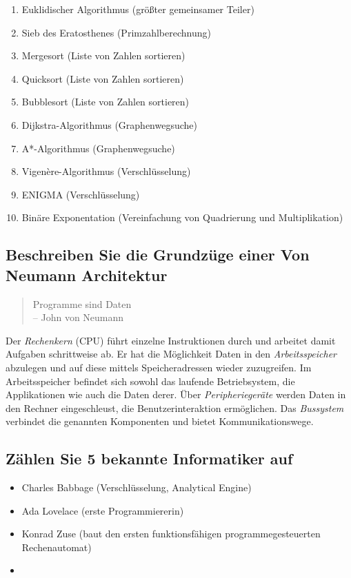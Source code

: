\begin{enumerate}
  \item Euklidischer Algorithmus (größter gemeinsamer Teiler)
  \item Sieb des Eratosthenes (Primzahlberechnung)
  \item Mergesort (Liste von Zahlen sortieren)
  \item Quicksort (Liste von Zahlen sortieren)
  \item Bubblesort (Liste von Zahlen sortieren)
  \item Dijkstra-Algorithmus (Graphenwegsuche)
  \item A*-Algorithmus (Graphenwegsuche)
  \item Vigenère-Algorithmus (Verschlüsselung)
  \item ENIGMA (Verschlüsselung)
  \item Binäre Exponentation (Vereinfachung von Quadrierung
    und Multiplikation)
\end{enumerate}

\subsection{Beschreiben Sie die Grundzüge einer Von Neumann Architektur}

\begin{quote}
    Programme sind Daten \\
    -- John von Neumann
\end{quote}

Der \emph{Rechenkern} (CPU) führt einzelne Instruktionen durch und
arbeitet damit Aufgaben schrittweise ab. Er hat die Möglichkeit
Daten in den \emph{Arbeitsspeicher} abzulegen und auf diese mittels
Speicheradressen wieder zuzugreifen. Im Arbeitsspeicher befindet sich sowohl
das laufende Betriebsystem, die Applikationen wie auch die Daten derer.
Über \emph{Peripheriegeräte} werden Daten in den Rechner eingeschleust, die
Benutzerinteraktion ermöglichen. Das \emph{Bussystem} verbindet die
genannten Komponenten und bietet Kommunikationswege.

\subsection{Zählen Sie 5 bekannte Informatiker auf}

\begin{itemize}
  \item Charles Babbage (Verschlüsselung, Analytical Engine)
  \item Ada Lovelace (erste Programmiererin)
  \item Konrad Zuse (baut den ersten funktionsfähigen programmegesteuerten
    Rechenautomat)
  \item 
\end{itemize}

